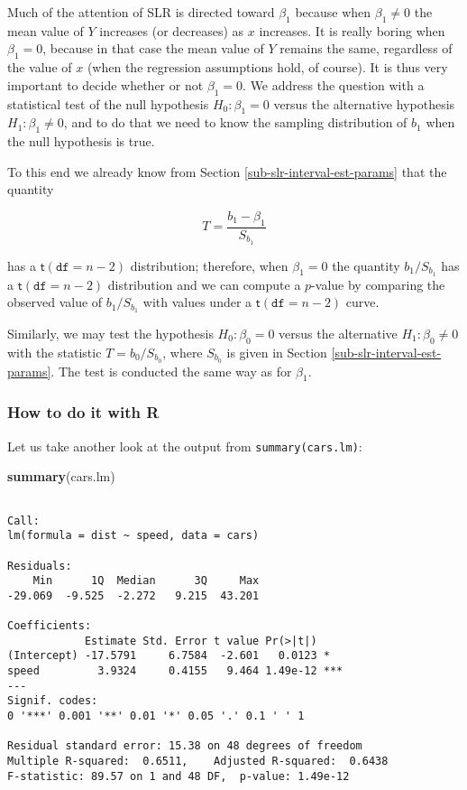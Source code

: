 \documentclass[]{book}
\newenvironment{Shaded}{\begin{snugshade}}{\end{snugshade}}
\newcommand{\KeywordTok}[1]{\textcolor[rgb]{0.13,0.29,0.53}{\textbf{{#1}}}}
\newcommand{\NormalTok}[1]{{#1}}
\numberwithin{equation}{chapter}
\numberwithin{figure}{chapter}
\theoremstyle{plain}
\theoremstyle{definition}
\theoremstyle{remark}
\theoremstyle{definition}
\theoremstyle{definition}
\theoremstyle{remark}
\begin{document}
Much of the attention of SLR is directed toward \(\beta_{1}\) because
when \(\beta_{1}\neq 0\) the mean value of \(Y\) increases (or
decreases) as \(x\) increases. It is really boring when \(\beta_{1}=0\),
because in that case the mean value of \(Y\) remains the same,
regardless of the value of \(x\) (when the regression assumptions hold,
of course). It is thus very important to decide whether or not
\(\beta_{1} = 0\). We address the question with a statistical test of
the null hypothesis \(H_{0}:\beta_{1}=0\) versus the alternative
hypothesis \(H_{1}:\beta_{1}\neq0\), and to do that we need to know the
sampling distribution of \(b_{1}\) when the null hypothesis is true.

To this end we already know from Section
\ref{sub-slr-interval-est-params} that the quantity

\begin{equation} 
T=\frac{b_{1}-\beta_{1}}{S_{b_{1}}}
\end{equation}

has a \(\mathsf{t}(\mathtt{df}=n-2)\) distribution; therefore, when
\(\beta_{1}=0\) the quantity \(b_{1}/S_{b_{1}}\) has a
\(\mathsf{t}(\mathtt{df}=n-2)\) distribution and we can compute a
\(p\)-value by comparing the observed value of \(b_{1}/S{}_{b_{1}}\)
with values under a \(\mathsf{t}(\mathtt{df}=n-2)\) curve.

Similarly, we may test the hypothesis \(H_{0}:\beta_{0}=0\) versus the
alternative \(H_{1}:\beta_{0}\neq0\) with the statistic
\(T=b_{0}/S_{b_{0}}\), where \(S_{b_{0}}\) is given in Section
\ref{sub-slr-interval-est-params}. The test is conducted the same way as
for \(\beta_{1}\).

\subsubsection{How to do it with R}\label{how-to-do-it-with-r-52}

Let us take another look at the output from \texttt{summary(cars.lm)}:

\begin{Shaded}
\begin{Highlighting}[]
\KeywordTok{summary}\NormalTok{(cars.lm)}
\end{Highlighting}
\end{Shaded}

\begin{verbatim}

Call:
lm(formula = dist ~ speed, data = cars)

Residuals:
    Min      1Q  Median      3Q     Max 
-29.069  -9.525  -2.272   9.215  43.201 

Coefficients:
            Estimate Std. Error t value Pr(>|t|)    
(Intercept) -17.5791     6.7584  -2.601   0.0123 *  
speed         3.9324     0.4155   9.464 1.49e-12 ***
---
Signif. codes:  
0 '***' 0.001 '**' 0.01 '*' 0.05 '.' 0.1 ' ' 1

Residual standard error: 15.38 on 48 degrees of freedom
Multiple R-squared:  0.6511,    Adjusted R-squared:  0.6438 
F-statistic: 89.57 on 1 and 48 DF,  p-value: 1.49e-12
\end{verbatim}
\end{document}
